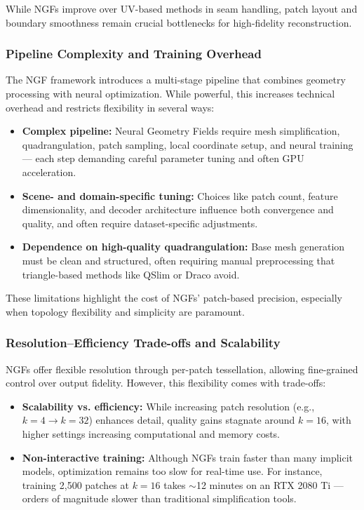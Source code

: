 While NGFs improve over UV-based methods in seam handling, patch layout and boundary smoothness remain crucial bottlenecks for high-fidelity reconstruction. 

\subsubsection{Pipeline Complexity and Training Overhead}

The NGF framework introduces a multi-stage pipeline that combines geometry processing with neural optimization. 
While powerful, this increases technical overhead and restricts flexibility in several ways: 

\begin{itemize}
    \item \textbf{Complex pipeline:} Neural Geometry Fields require mesh simplification, quadrangulation, patch sampling, local coordinate setup, and neural training --- each step demanding careful parameter tuning and often GPU acceleration.
    \item \textbf{Scene- and domain-specific tuning:} Choices like patch count, feature dimensionality, and decoder architecture influence both convergence and quality, and often require dataset-specific adjustments.
    \item \textbf{Dependence on high-quality quadrangulation:} Base mesh generation must be clean and structured, often requiring manual preprocessing that triangle-based methods like QSlim or Draco avoid.
\end{itemize}

These limitations highlight the cost of NGFs' patch-based precision, especially when topology flexibility and simplicity are paramount. 

\subsubsection{Resolution–Efficiency Trade-offs and Scalability}

NGFs offer flexible resolution through per-patch tessellation, allowing fine-grained control over output fidelity. 
However, this flexibility comes with trade-offs: 

\begin{itemize}
    \item \textbf{Scalability vs. efficiency:} While increasing patch resolution (e.g., $k = 4 \rightarrow k = 32$) enhances detail, quality gains stagnate around $k = 16$, with higher settings increasing computational and memory costs.
    \item \textbf{Non-interactive training:} Although NGFs train faster than many implicit models, optimization remains too slow for real-time use. For instance, training 2,500 patches at $k = 16$ takes $\sim$12 minutes on an RTX 2080 Ti --- orders of magnitude slower than traditional simplification tools.
\end{itemize}

